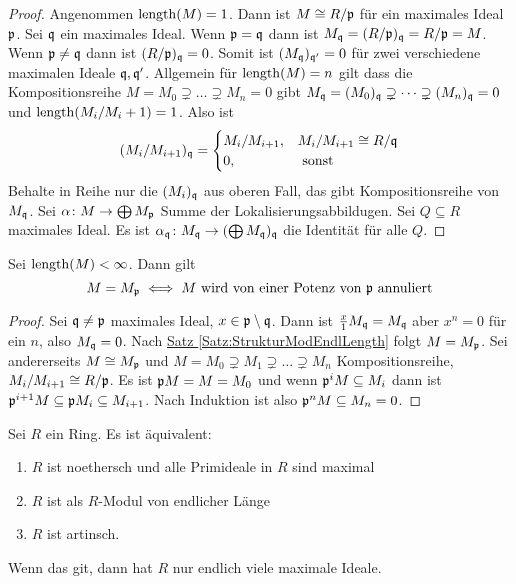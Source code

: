 \begin{proof}
    Angenommen $\operatorname{length}(M)=1$. Dann ist $M\cong R/\mathfrak{p}$ für ein maximales Ideal $\mathfrak{p}$. Sei $\mathfrak{q}$ ein maximales Ideal. Wenn $\mathfrak{p}=\mathfrak{q}$ dann ist $M_{\mathfrak{q}}=(R/\mathfrak{p})_{\mathfrak{q}}=R/\mathfrak{p}=M$.
    Wenn $\mathfrak{p}\neq\mathfrak{q}$ dann ist $(R/\mathfrak{p})_{\mathfrak{q}}=0$. Somit ist $(M_{\mathfrak{q}})_{\mathfrak{q}'}=0$ für zwei verschiedene maximalen Ideale $\mathfrak{q},\mathfrak{q}'$. Allgemein für $\operatorname{length}(M)=n$ gilt dass die Kompositionsreihe $M=M_0\supsetneq \dots\supsetneq M_n=0$ gibt $M_{\mathfrak{q}}=(M_0)_{\mathfrak{q}}\supsetneq \dots\supsetneq (M_n)_{\mathfrak{q}}=0$ und $\operatorname{length}(M_i/M_i+1)=1$. Also ist 
    $$(M_i/M_{i+1})_{\mathfrak{q}}=\begin{cases}
        M_i/M_{i+1}, & M_i/M_{i+1}\cong R/\mathfrak{q}\\
        0 , &\text{ sonst}
    \end{cases}$$
    Behalte in Reihe nur die $(M_i)_{\mathfrak{q}}$ aus oberen Fall, das gibt Kompositionsreihe von $M_{\mathfrak{q}}$.
    Sei $\alpha\colon M\to \bigoplus M_{\mathfrak{p}}$ Summe der Lokalisierungsabbildugen. Sei $Q\subseteq R$ maximales Ideal. Es ist $\alpha_{\mathfrak{q}}\colon M_{\mathfrak{q}}\to (\bigoplus M_{\mathfrak{q}})_{\mathfrak{q}}$ die Identität für alle $Q$.
\end{proof}
\begin{Satz}
    Sei $\operatorname{length}(M)<\infty$. Dann gilt
    $$M=M_{\mathfrak{p}}\iff M\text{ wird von einer Potenz von $\mathfrak{p}$ annuliert}$$
\end{Satz}
\begin{proof}
    Sei $\mathfrak{q}\neq\mathfrak{p}$ maximales Ideal, $x\in\mathfrak{p}\setminus\mathfrak{q}$. Dann ist $\frac x 1 M_{\mathfrak{q}}=M_{\mathfrak{q}}$ aber $x^n=0$ für ein $n$, also $M_{\mathfrak{q}}=0$.
    Nach \hyperref[Satz:StrukturModEndlLength]{ Satz \ref{Satz:StrukturModEndlLength}} folgt $M=M_{\mathfrak{p}}$.
    Sei andererseits $M\cong M_{\mathfrak{p}}$ und $M=M_0\supsetneq M_1\supsetneq \dots \supsetneq M_n$ Kompositionsreihe, $M_i/M_{i+1}\cong R/\mathfrak{p}$. Es ist $\mathfrak{p} M=M=M_0$ und wenn $\mathfrak{p}^iM\subseteq M_i$ dann ist $\mathfrak{p}^{i+1}M\subseteq \mathfrak{p} M_i\subseteq M_{i+1}$. Nach Induktion ist also $\mathfrak{p}^nM\subseteq M_n=0$.
\end{proof}
\begin{Satz}\label{Satz:ArtinRingEndlLen}
    Sei $R$ ein Ring. Es ist äquivalent:
    \begin{enumerate}
        \item $R$ ist noethersch und alle Primideale in $R$ sind maximal
        \item $R$ ist als $R$-Modul von endlicher Länge
        \item $R$ ist artinsch.
    \end{enumerate}
    Wenn das git, dann hat $R$ nur endlich viele maximale Ideale.
\end{Satz}

